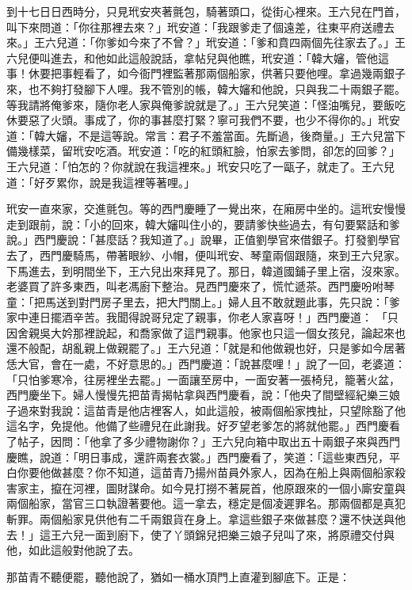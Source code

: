 到十七日日西時分，只見玳安夾著氈包，騎著頭口，從街心裡來。王六兒在門首，叫下來問道：「你往那裡去來？」玳安道：「我跟爹走了個遠差，往東平府送禮去來。」王六兒道：「你爹如今來了不曾？」玳安道：「爹和賁四兩個先往家去了。」王六兒便叫進去，和他如此這般說話，拿帖兒與他瞧，玳安道：「韓大嬸，管他這事！休要把事輕看了，如今衙門裡監著那兩個船家，供著只要他哩。拿過幾兩銀子來，也不夠打發腳下人哩。我不管別的帳，韓大嬸和他說，只與我二十兩銀子罷。等我請將俺爹來，隨你老人家與俺爹說就是了。」王六兒笑道：「怪油嘴兒，要飯吃休要惡了火頭。事成了，你的事甚麼打緊？寧可我們不要，也少不得你的。」玳安道：「韓大嬸，不是這等說。常言：君子不羞當面。先斷過，後商量。」王六兒當下備幾樣菜，留玳安吃酒。玳安道：「吃的紅頭紅臉，怕家去爹問，卻怎的回爹？」王六兒道：「怕怎的？你就說在我這裡來。」玳安只吃了一甌子，就走了。王六兒道：「好歹累你，說是我這裡等著哩。」

玳安一直來家，交進氈包。等的西門慶睡了一覺出來，在廂房中坐的。這玳安慢慢走到跟前，說：「小的回來，韓大嬸叫住小的，要請爹快些過去，有句要緊話和爹說。」西門慶說：「甚麼話？我知道了。」說畢，正值劉學官來借銀子。打發劉學官去了，西門慶騎馬，帶著眼紗、小帽，便叫玳安、琴童兩個跟隨，來到王六兒家。下馬進去，到明間坐下，王六兒出來拜見了。那日，韓道國鋪子里上宿，沒來家。老婆買了許多東西，叫老馮廚下整治。見西門慶來了，慌忙遞茶。西門慶吩咐琴童：「把馬送到對門房子里去，把大門關上。」婦人且不敢就題此事，先只說：「爹家中連日擺酒辛苦。我聞得說哥兒定了親事，你老人家喜呀！」西門慶道： 「只因舍親吳大妗那裡說起，和喬家做了這門親事。他家也只這一個女孩兒，論起來也還不般配，胡亂親上做親罷了。」王六兒道：「就是和他做親也好，只是爹如今居著恁大官，會在一處，不好意思的。」西門慶道：「說甚麼哩！」說了一回，老婆道：「只怕爹寒冷，往房裡坐去罷。」一面讓至房中，一面安著一張椅兒，籠著火盆，西門慶坐下。婦人慢慢先把苗青揭帖拿與西門慶看，說：「他央了間壁經紀樂三娘子過來對我說：這苗青是他店裡客人，如此這般，被兩個船家拽扯，只望除豁了他這名字，免提他。他備了些禮兒在此謝我。好歹望老爹怎的將就他罷。」西門慶看了帖子，因問：「他拿了多少禮物謝你？」王六兒向箱中取出五十兩銀子來與西門慶瞧，說道：「明日事成，還許兩套衣裳。」西門慶看了，笑道：「這些東西兒，平白你要他做甚麼？你不知道，這苗青乃揚州苗員外家人，因為在船上與兩個船家殺害家主，攛在河裡，圖財謀命。如今見打撈不著屍首，他原跟來的一個小廝安童與兩個船家，當官三口執證著要他。這一拿去，穩定是個凌遲罪名。那兩個都是真犯斬罪。兩個船家見供他有二千兩銀貨在身上。拿這些銀子來做甚麼？還不快送與他去！」這王六兒一面到廚下，使了丫頭錦兒把樂三娘子兒叫了來，將原禮交付與他，如此這般對他說了去。

那苗青不聽便罷，聽他說了，猶如一桶水頂門上直灌到腳底下。正是：

